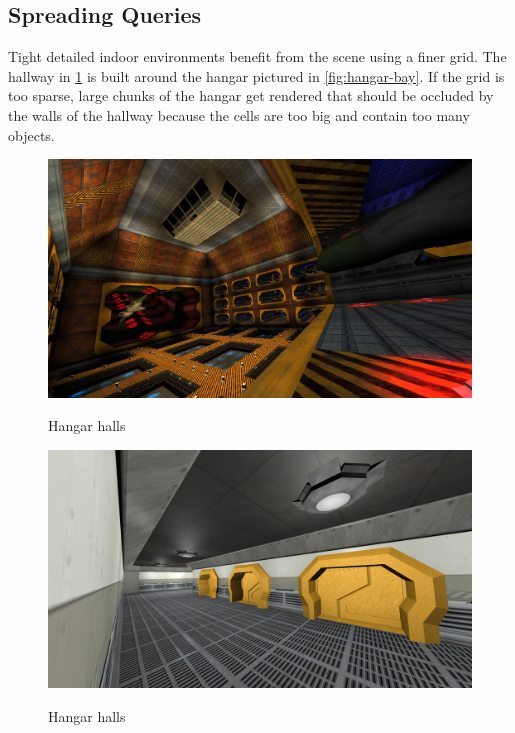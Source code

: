 \documentclass[12pt]{ucthesis}
\newcommand{\captionfonts}{\small\bf\ssp}
\begin{document}
\subsection {Spreading Queries}
\label{spreading-queries}

Tight detailed indoor environments benefit from the scene using a finer grid.
The hallway in \ref{fig:hangar-halls} is built around the hangar pictured in \ref{fig:hangar-bay}.
If the grid is too sparse, large chunks of the hangar get rendered that should be occluded by the walls of the hallway because the cells are too big and contain too many objects.

\begin{figure}
\begin{center}
\includegraphics[width=\textwidth]{Images/Hangar.jpg}
\captionfonts
\caption[Hangar Bay]{Hangar halls}
\label{fig:hangar-bay}
\includegraphics[width=\textwidth]{Images/HallCorner.jpg}
\captionfonts
\caption[Hangar Halls]{Hangar halls}
\label{fig:hangar-halls}
\end{center}
\end{figure}
\end{document}

